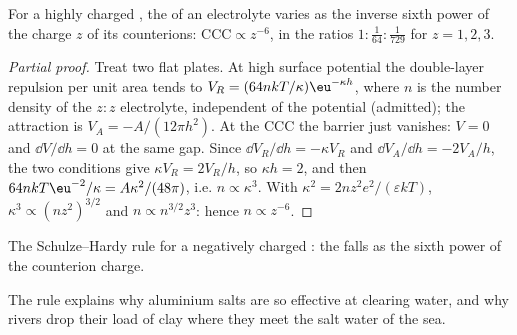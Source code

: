 \begin{proposition}\label{prop:b3:colloids:schulze-hardy}
For a highly charged , the  of an
electrolyte varies as the inverse sixth power of the charge $z$ of its
counterions: $\text{CCC} \propto z^{-6}$, in the ratios $1 : \frac{1}{64} : \frac{1}{729}$ for $z = 1, 2, 3$.
\end{proposition}

\begin{proof}[Partial proof]
Treat two flat plates. At high surface potential the double-layer repulsion per
unit area tends to $V_R = (64nkT/\kappa)\eu^{-\kappa h}$, where $n$ is the number density of the $z{:}z$
electrolyte, independent of the potential (admitted); the attraction is $V_A =
-A/(12\pi h^2)$. At the CCC the barrier just vanishes: $V = 0$ and $\dd V/\dd h = 0$ at the same
gap. Since $\dd V_R/\dd h = -\kappa V_R$ and $\dd V_A/\dd h = -2V_A/h$, the two conditions give
$\kappa V_R = 2V_R/h$, so $\kappa h = 2$, and then $64nkT\eu^{-2}/\kappa = A\kappa^2/(48\pi)$, i.e. $n \propto \kappa^3$. With
$\kappa^2 = 2nz^2e^2/(\varepsilon kT)$, $\kappa^3 \propto (nz^2)^{3/2}$ and $n \propto n^{3/2}z^3$: hence $n \propto z^{-6}$.
\end{proof}

\begin{omfigure}

{\small The Schulze--Hardy rule for a negatively charged : the  falls as the sixth power of the counterion charge.}
\end{omfigure}

The rule explains why aluminium salts are so effective at clearing water, and
why rivers drop their load of clay where they meet the salt water of the sea.

